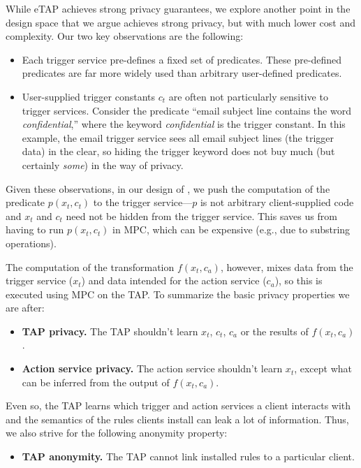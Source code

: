While \textsf{eTAP} achieves strong privacy guarantees, we explore another point
in the design space that we argue achieves strong privacy, but with much lower
cost and complexity. Our two key observations are the following:
\begin{itemize}
  \item Each trigger service pre-defines a fixed set of predicates. These
    pre-defined predicates are far more widely used than arbitrary user-defined
    predicates.
  \item User-supplied trigger constants $c_t$ are often not particularly
    sensitive to trigger services. Consider the predicate ``email subject line
    contains the word \emph{confidential},'' where the keyword
    \emph{confidential} is the trigger constant. In this example, the email
    trigger service sees all email subject lines (the trigger data) in the
    clear, so hiding the trigger keyword does not buy much (but certainly
    \emph{some}) in the way of privacy.
\end{itemize}
Given these observations, in our design of \sys, we push the computation of the
predicate $p(x_t, c_t)$ to the trigger service---$p$ is not arbitrary
client-supplied code and $x_t$ and $c_t$ need not be hidden from the trigger
service. This saves us from having to run $p(x_t, c_t)$ in MPC, which can be
expensive (e.g., due to substring operations).

The computation of the transformation $f(x_t, c_a)$, however, mixes data from
the trigger service ($x_t$) and data intended for the action service ($c_a$), so
this is executed using MPC on the TAP. To summarize the basic privacy properties
we are after:
\begin{itemize}
  \item \textbf{TAP privacy.} The TAP shouldn't learn $x_t$, $c_t$, $c_a$ or the
    results of $f(x_t, c_a)$.
  \item \textbf{Action service privacy.} The action service shouldn't learn
    $x_t$, except what can be inferred from the output of $f(x_t, c_a)$.
\end{itemize}
Even so, the TAP learns which trigger and action services a client interacts
with and the semantics of the rules clients install can leak a lot of
information. Thus, we also strive for the following anonymity property:
\begin{itemize}
  \item \textbf{TAP anonymity.} The TAP cannot link installed rules to a
    particular client.
\end{itemize}

